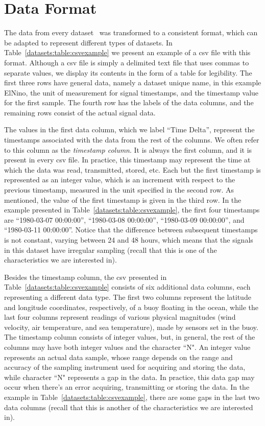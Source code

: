 
\clearpage
\section{Data Format}
\label{datasets:over}


The data from every dataset \dataCite\ was transformed to a consistent format, which can be adapted to represent different types of datasets. In Table~\ref{datasets:table:csvexample} we present an example of a csv file with this format. Although a csv file is simply a delimited text file that uses commas to separate values, we display its contents in the form of a table for legibility. The first three rows have general data, namely a dataset unique name, in this example ElNino, the unit of measurement for signal timestamps, and the timestamp value for the first sample. The fourth row has the labels of the data columns, and the remaining rows consist of the actual signal data.





\vspace{-5pt}
The values in the first data column, which we label ``Time Delta'', represent the timestamps associated with the data from the rest of the columns. We often refer to this column as the \textit{timestamp column}. It is always the first column, and it is present in every csv file. In practice, this timestamp may represent the time at which the data was read, transmitted, stored, etc. Each but the first timestamp is represented as an integer value, which is an increment with respect to the previous timestamp, measured in the unit specified in the second row. As mentioned, the value of the first timestamp is given in the third row. In the example presented in Table~\ref{datasets:table:csvexample}, the first four timestamps are ``1980-03-07 00:00:00'', ``1980-03-08 00:00:00'', ``1980-03-09 00:00:00'', and ``1980-03-11 00:00:00''. Notice that the difference between subsequent timestamps is not constant, varying between 24 and 48 hours, which means that the signals in this dataset have irregular sampling (recall that this is one of the characteristics we are interested in).


Besides the timestamp column, the csv presented in Table~\ref{datasets:table:csvexample} consists of six additional data columns, each representing a different data type. The first two columns represent the latitude and longitude coordinates, respectively, of a buoy floating in the ocean, while the last four columns represent readings of various physical magnitudes (wind velocity, air temperature, and sea temperature), made by sensors set in the buoy. The timestamp column consists of integer values, but, in general, the rest of the columns may have both integer values and the character ``N". An integer value represents an actual data sample, whose range depends on the range and accuracy of the sampling instrument used for acquiring and storing the data, while character ``N" represents a gap in the data. In practice, this data gap may occur when there's an error acquiring, transmitting or storing the data. In the example in Table~\ref{datasets:table:csvexample}, there are some gaps in the last two data columns (recall that this is another of the characteristics we are interested in).

